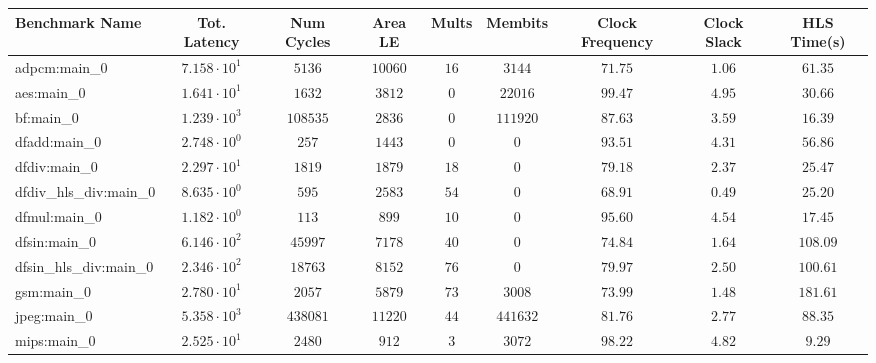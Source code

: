 \begin{tabular}{|l|c|c|c|c|c|c|c|c|}
\hline
Benchmark Name          & Tot. Latency           & Num Cycles & Area LE   & Mults   & Membits    & Clock Frequency & Clock Slack & HLS Time(s) \\
\hline
adpcm:main\_0           & $ 7.158 \cdot 10^{1} $ & $ 5136   $ & $ 10060 $ & $ 16  $ & $ 3144   $ & $ 71.75       $ & $ 1.06    $ & $ 61.35   $ \\
aes:main\_0             & $ 1.641 \cdot 10^{1} $ & $ 1632   $ & $ 3812  $ & $ 0   $ & $ 22016  $ & $ 99.47       $ & $ 4.95    $ & $ 30.66   $ \\
bf:main\_0              & $ 1.239 \cdot 10^{3} $ & $ 108535 $ & $ 2836  $ & $ 0   $ & $ 111920 $ & $ 87.63       $ & $ 3.59    $ & $ 16.39   $ \\
dfadd:main\_0           & $ 2.748 \cdot 10^{0} $ & $ 257    $ & $ 1443  $ & $ 0   $ & $ 0      $ & $ 93.51       $ & $ 4.31    $ & $ 56.86   $ \\
dfdiv:main\_0           & $ 2.297 \cdot 10^{1} $ & $ 1819   $ & $ 1879  $ & $ 18  $ & $ 0      $ & $ 79.18       $ & $ 2.37    $ & $ 25.47   $ \\
dfdiv\_hls\_div:main\_0 & $ 8.635 \cdot 10^{0} $ & $ 595    $ & $ 2583  $ & $ 54  $ & $ 0      $ & $ 68.91       $ & $ 0.49    $ & $ 25.20   $ \\
dfmul:main\_0           & $ 1.182 \cdot 10^{0} $ & $ 113    $ & $ 899   $ & $ 10  $ & $ 0      $ & $ 95.60       $ & $ 4.54    $ & $ 17.45   $ \\
dfsin:main\_0           & $ 6.146 \cdot 10^{2} $ & $ 45997  $ & $ 7178  $ & $ 40  $ & $ 0      $ & $ 74.84       $ & $ 1.64    $ & $ 108.09  $ \\
dfsin\_hls\_div:main\_0 & $ 2.346 \cdot 10^{2} $ & $ 18763  $ & $ 8152  $ & $ 76  $ & $ 0      $ & $ 79.97       $ & $ 2.50    $ & $ 100.61  $ \\
gsm:main\_0             & $ 2.780 \cdot 10^{1} $ & $ 2057   $ & $ 5879  $ & $ 73  $ & $ 3008   $ & $ 73.99       $ & $ 1.48    $ & $ 181.61  $ \\
jpeg:main\_0            & $ 5.358 \cdot 10^{3} $ & $ 438081 $ & $ 11220 $ & $ 44  $ & $ 441632 $ & $ 81.76       $ & $ 2.77    $ & $ 88.35   $ \\
mips:main\_0            & $ 2.525 \cdot 10^{1} $ & $ 2480   $ & $ 912   $ & $ 3   $ & $ 3072   $ & $ 98.22       $ & $ 4.82    $ & $ 9.29    $ \\

\end{tabular}
